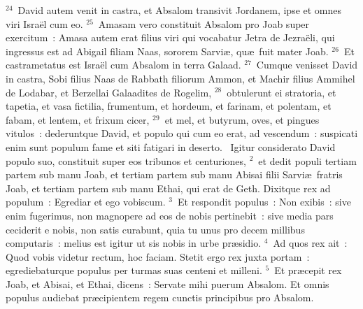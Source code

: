 ${}^{24}$~David autem venit in castra, et Absalom transivit Jordanem, ipse et omnes viri Isra\"el cum eo.
${}^{25}$~Amasam vero constituit Absalom pro Joab super exercitum~: Amasa autem erat filius viri qui vocabatur Jetra de Jezra\"eli, qui ingressus est ad Abigail filiam Naas, sororem Sarvi\ae , qu\ae\ fuit mater Joab.
${}^{26}$~Et castrametatus est Isra\"el cum Absalom in terra Galaad.
${}^{27}$~Cumque venisset David in castra, Sobi filius Naas de Rabbath filiorum Ammon, et Machir filius Ammihel de Lodabar, et Berzellai Galaadites de Rogelim,
${}^{28}$~obtulerunt ei stratoria, et tapetia, et vasa fictilia, frumentum, et hordeum, et farinam, et polentam, et fabam, et lentem, et frixum cicer,
${}^{29}$~et mel, et butyrum, oves, et pingues vitulos~: dederuntque David, et populo qui cum eo erat, ad vescendum~: suspicati enim sunt populum fame et siti fatigari in deserto.
~Igitur considerato David populo suo, constituit super eos tribunos et centuriones,
${}^{2}$~et dedit populi tertiam partem sub manu Joab, et tertiam partem sub manu Abisai filii Sarvi\ae\ fratris Joab, et tertiam partem sub manu Ethai, qui erat de Geth. Dixitque rex ad populum~: Egrediar et ego vobiscum.
${}^{3}$~Et respondit populus~: Non exibis~: sive enim fugerimus, non magnopere ad eos de nobis pertinebit~: sive media pars ceciderit e nobis, non satis curabunt, quia tu unus pro decem millibus computaris~: melius est igitur ut sis nobis in urbe pr\ae sidio.
${}^{4}$~Ad quos rex ait~: Quod vobis videtur rectum, hoc faciam. Stetit ergo rex juxta portam~: egrediebaturque populus per turmas suas centeni et milleni.
${}^{5}$~Et pr\ae cepit rex Joab, et Abisai, et Ethai, dicens~: Servate mihi puerum Absalom. Et omnis populus audiebat pr\ae cipientem regem cunctis principibus pro Absalom.


